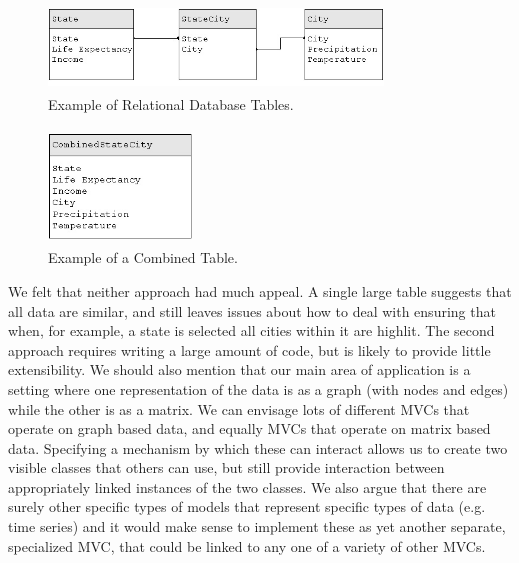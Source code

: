 \documentclass{article}[11pt]
\begin{document}
\begin{figure}[ht]
  \begin{center}
    \includegraphics[height=0.9in, width=3.5in]{newDatabaseTables.jpg}
    \caption{ Example of Relational Database Tables. }
    \label{Fig:DBTab}
  \end{center}
\end{figure}

\begin{figure}[ht]
  \begin{center}
    \includegraphics[height=1.2in, width=1.5in]{newOneDatabaseTable.jpg}
    \caption{ Example of a Combined Table. }
    \label{Fig:OneDBTab}
  \end{center}
\end{figure}

We felt that neither approach had much appeal. A single large table
suggests that all data are similar, and still leaves issues about how
to deal with ensuring that when, for example, a state is selected all
cities within it are highlit. The second approach requires writing a
large amount of code, but is likely to provide little
extensibility. We should also mention that our main area of
application is a setting where one representation of the data is as a
graph (with nodes and edges) while the other is as a matrix. We can
envisage lots of different MVCs that operate on graph based data, and
equally MVCs that operate on matrix based data. Specifying a mechanism
by which these can interact allows us to create two visible classes
that others can use, but still provide interaction between
appropriately linked instances of the two classes. We also argue that
there are surely other specific types of models that represent
specific types of data (e.g. time series) and it would make sense to
implement these as yet another separate, specialized MVC, that could
be linked to any one of a variety of other MVCs.
\end{document}

